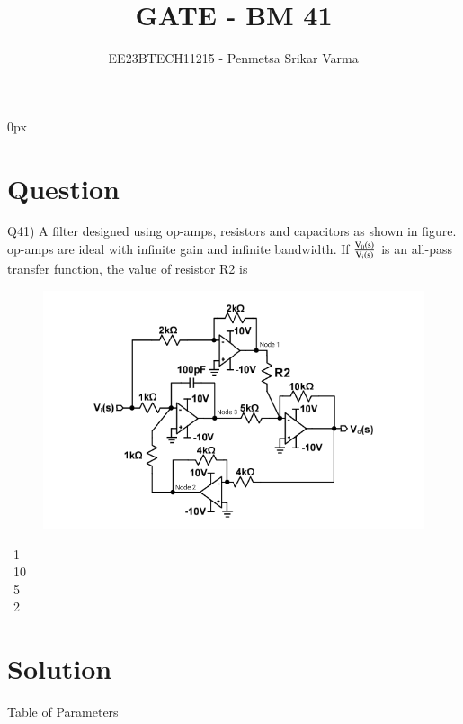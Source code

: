 \documentclass[beamer]{IEEEtran}
\theoremstyle{remark}
\begin{document}
\parindent 0px


\title{GATE - BM 41}
\author{EE23BTECH11215 - Penmetsa Srikar Varma$^{}$%
}
\maketitle
\newpage
\bigskip

\renewcommand{\thefigure}{\theenumi}
\renewcommand{\thetable}{\theenumi}
\section*{Question}
Q41) A filter designed using op-amps, resistors and capacitors as shown in figure.
op-amps are ideal with infinite gain and infinite bandwidth. If $\frac{\text{V}_0\left(\text{s}\right)}{\text{V}_\text{i}\left(\text{s}\right)}$ is an all-pass transfer function, the value of resistor R2  is\\
\begin{figure}[htbp]
    \centering
    \hspace*{-1.8cm}
    \includegraphics[scale=0.55]{figs/bm,41.png}
    \label{bm,41}
\end{figure}
\begin{center}
\end{center}
\ 1\\
\ 10\\
\ 5\\ 
\ 2\ \qquad\qquad\qquad\quad\qquad\qquad\qquad\qquad{}
\section*{Solution}
\begin{table}[h]
    \centering
    
    \label{table}
\end{table}
\begin{center}
    Table of Parameters
\end{center}
\end{document}
